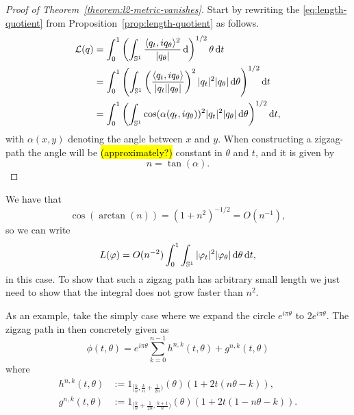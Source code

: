 \message{ !name(mainfile.tex)}\documentclass[a4,danish]{article}
\begin{document}
\begin{proof}[Proof of Theorem~\ref{theorem:l2-metric-vanishes}]
  Start by rewriting the \eqref{eq:length-quotient} from Proposition~\ref{prop:length-quotient} as follows.
  \begin{align*}
    \mathcal{L}(q) &
                     = \int_{0}^{1}
                     \left(
                     \int_{\mathbb{S}^{1}} \frac{\langle q_{t},i q_{\theta}\rangle^2}
                     {|q_{\theta}|}  \mathop{}\!\mathrm{d}
                     \right)^{1/2} \theta \mathop{}\!\mathrm{d} t \\
                   & =  \int_{0}^{1}
                     \left(
                     \int_{\mathbb{S}^{1}}
                     \left(
                     \frac{\langle q_{t},i
                     q_{\theta}\rangle}{| q_{t}|| q_{\theta}|}
                     \right)^2
                     | q_t|^2   | q_{\theta}|
                     \mathop{}\!\mathrm{d} \theta
                     \right)^{1/2} \mathop{}\!\mathrm{d} t \\
                   &  =
                     \int_{0}^{1}
                     \left(
                     \int_{\mathbb{S}^{1}}
                     \cos(\alpha( q_t, i q_{\theta}))^2
                     | q_t|^2   | q_{\theta}|
                     \mathop{}\!\mathrm{d} \theta
                     \right)^{1/2}\mathop{}\!\mathrm{d} t,
  \end{align*}
with $\alpha(x,y)$ denoting the angle between $x$ and $y$. When
constructing a zigzag-path the angle will be \hl{(approximately?)}
constant in $\theta$ and $t$,
and it is given by
\begin{equation*}
  n = \tan(\alpha).
\end{equation*}
\end{proof}

We have that
\begin{equation*}
  \cos(\arctan(n)) = (1+n^2)^{-1/2}
  = O(n^{-1}),
\end{equation*}
so we can write
\begin{equation*}
  L(\varphi) = O(n^{-2})
  \int_{0}^{1} \int_{\mathbb{S}^{1}}
  |\varphi_t|^2   |\varphi_{\theta}|
  \mathop{}\!\mathrm{d} \theta \mathop{}\!\mathrm{d} t,
\end{equation*}
in this case. To show that such a zigzag path has arbitrary
small length we just need to show that the integral does not grow
faster than $n^2$.

As an example, take the simply case where we expand the circle $e^{i\pi\theta}$ to
$2e^{i\pi\theta}$. The zigzag path in then concretely given as
\begin{equation*}
  \phi(t,\theta) = e^{i\pi\theta}
    \sum_{k=0}^{n-1}
    h^{n,k}(t,\theta) + g^{n,k}(t,\theta)
\end{equation*}
where
\begin{equation*}
  \begin{aligned}
    h^{n,k}(t,\theta) & := 1_{[\frac{k}{n},\frac{k}{n} +
      \frac{1}{2n})}(\theta) \left( 1+2t(n\theta-k) \right), \\
    g^{n,k}(t,\theta) & := 1_{[\frac{k}{n} + \frac{1}{2n},\frac{k+1}{n})}(\theta)
    \left( 1+2t(1-n\theta-k) \right).
  \end{aligned}
\end{equation*}
\end{document}
